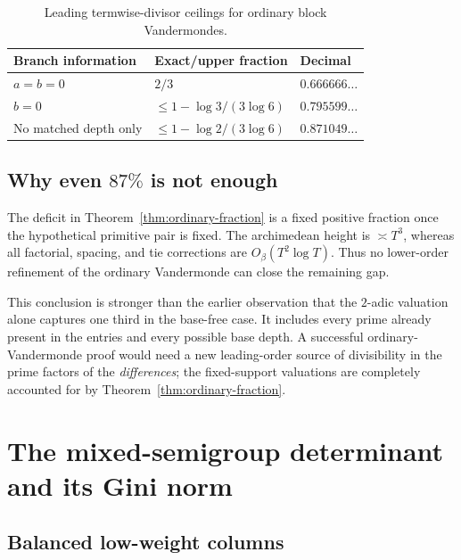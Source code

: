 \documentclass[11pt,oneside]{article}
\theoremstyle{definition}
\theoremstyle{remark}
\begin{document}
\begin{table}[ht]
\centering
\caption{Leading termwise-divisor ceilings for ordinary block Vandermondes.}
\begin{tabular}{@{}lll@{}}
\toprule
Branch information & Exact/upper fraction & Decimal\\
\midrule
$a=b=0$ & $2/3$ & $0.666666\ldots$\\
$b=0$ & $\le1-\log3/(3\log6)$ & $0.795599\ldots$\\
No matched depth only & $\le1-\log2/(3\log6)$ & $0.871049\ldots$\\
\bottomrule
\end{tabular}
\end{table}

\subsection{Why even \texorpdfstring{$87\%$}{87 percent} is not enough}

The deficit in Theorem~\ref{thm:ordinary-fraction} is a fixed positive fraction once the
hypothetical primitive pair is fixed.  The archimedean height is $\asymp T^3$, whereas all
factorial, spacing, and tie corrections are $O_\beta(T^2\log T)$.  Thus no lower-order
refinement of the ordinary Vandermonde can close the remaining gap.

This conclusion is stronger than the earlier observation that the $2$-adic valuation alone
captures one third in the base-free case.  It includes every prime already present in the
entries and every possible base depth.  A successful ordinary-Vandermonde proof would need a
new leading-order source of divisibility in the prime factors of the \emph{differences}; the
fixed-support valuations are completely accounted for by
Theorem~\ref{thm:ordinary-fraction}.

\section{The mixed-semigroup determinant and its Gini norm}
\label{sec:mixed}

\subsection{Balanced low-weight columns}
\end{document}

